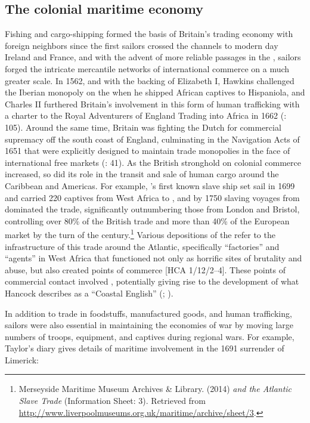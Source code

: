 \subsection{{The colonial maritime economy}}\label{sec:4.3.3}
\largerpage
  Fishing and cargo-shipping formed the basis of Britain’s trading economy with foreign neighbors since the first sailors crossed the channels to modern day Ireland and France, and with the advent of more reliable  passages in the , sailors forged the intricate mercantile networks of international commerce on a much greater scale. In {1562}, and with the backing of Elizabeth I, Hawkins challenged the Iberian monopoly on the  when he shipped African captives to Hispaniola, and Charles II furthered Britain’s involvement in this form of human trafficking with a charter to the Royal Adventurers of England Trading into Africa in 1662 (\citealt{Brown2011}: 105). Around the same time, Britain was fighting the Dutch for commercial supremacy off the south coast of England, culminating in the Navigation Acts of 1651 that were explicitly designed to maintain trade monopolies in the face of international free markets (\citealt{Brown2011}: 41). As the British stronghold on colonial commerce increased, so did its role in the transit and sale of human cargo around the Caribbean and Americas. For example, ’s first known slave ship set sail in 1699 and carried 220 captives from West Africa to , and by 1750 slaving voyages from  dominated the trade, significantly outnumbering those from London and Bristol, controlling over 80\% of the British trade and more than 40\% of the European market by the turn of the century.\footnote{Merseyside Maritime Museum Archives \& Library. (2014) \textit{ and the Atlantic Slave Trade} (Information Sheet: 3). Retrieved from \url{http://www.liverpoolmuseums.org.uk/maritime/archive/sheet/3}.} 
  Various depositions of the  refer to the infrastructure of this trade around the Atlantic, specifically “factories” and “agents” in West Africa that functioned not only as horrific sites of brutality and abuse, but also created points of commerce [HCA 1/12/2–4]. These points of commercial contact involved , potentially giving rise to the development of what Hancock describes as a “Coastal English” (\citealt{Hancock1986}; \citealt{DelgadoHancock2017}).

In addition to trade in foodstuffs, manufactured goods, and human trafficking, sailors were also essential in maintaining the economies of war by moving large numbers of troops, equipment, and captives during regional wars. For example, Taylor’s diary gives details of maritime involvement in the 1691 surrender of Limerick:


